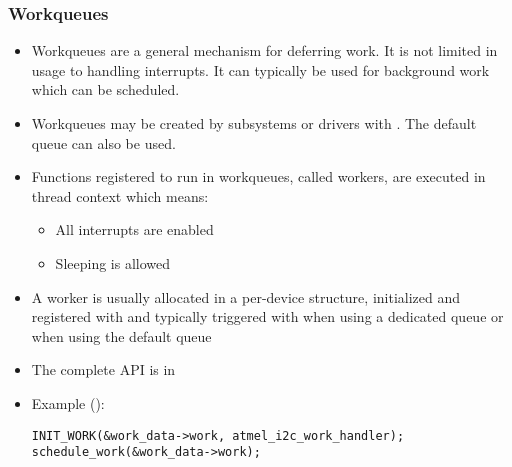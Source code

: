 \begin{frame}[fragile]
  \frametitle{Workqueues}
  \begin{itemize}
  \item Workqueues are a general mechanism for deferring work. It is
    not limited in usage to handling interrupts. It can typically
    be used for background work which can be scheduled.
  \item Workqueues may be created by subsystems or drivers with
    . The default queue can also be used.
  \item Functions registered to run in workqueues, called workers, are
    executed in thread context which means:
    \begin{itemize}
    \item All interrupts are enabled
    \item Sleeping is allowed
    \end{itemize}
  \item A worker is usually allocated in a per-device structure,
    initialized and registered with  and typically
    triggered with  when using a dedicated queue or
     when using the default queue
  \item The complete API is in 
  \item Example ():
\begin{verbatim}
INIT_WORK(&work_data->work, atmel_i2c_work_handler);
schedule_work(&work_data->work);
\end{verbatim}
  \end{itemize}
\end{frame}

